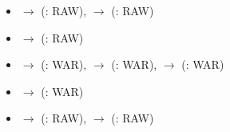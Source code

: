 \begin{itemize}
\item {} $\rightarrow$  (: RAW), 
       $\rightarrow$  (: RAW)
\item {} $\rightarrow$  (: RAW)
\item {} $\rightarrow$  (: WAR), 
       $\rightarrow$  (: WAR), 
       $\rightarrow$  (: WAR)
\item {} $\rightarrow$  (: WAR)
\item {} $\rightarrow$  (: RAW), 
       $\rightarrow$  (: RAW)
\end{itemize}
